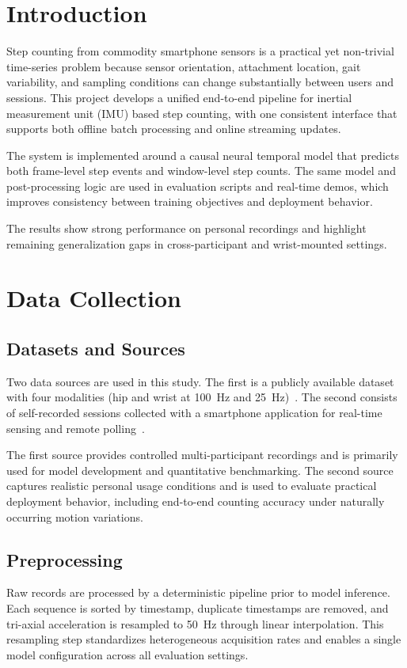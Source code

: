 \section{Introduction}
Step counting from commodity smartphone sensors is a practical yet non-trivial time-series problem because sensor orientation, attachment location, gait variability, and sampling conditions can change substantially between users and sessions. This project develops a unified end-to-end pipeline for inertial measurement unit (IMU) based step counting, with one consistent interface that supports both offline batch processing and online streaming updates.

The system is implemented around a causal neural temporal model that predicts both frame-level step events and window-level step counts. The same model and post-processing logic are used in evaluation scripts and real-time demos, which improves consistency between training objectives and deployment behavior.

The results show strong performance on personal recordings and highlight remaining generalization gaps in cross-participant and wrist-mounted settings.

\section{Data Collection}
\subsection{Datasets and Sources}
Two data sources are used in this study. The first is a publicly available dataset with four modalities (hip and wrist at 100~Hz and 25~Hz)~\cite{oxwalk}. The second consists of self-recorded sessions collected with a smartphone application for real-time sensing and remote polling~\cite{phyphox}.

The first source provides controlled multi-participant recordings and is primarily used for model development and quantitative benchmarking. The second source captures realistic personal usage conditions and is used to evaluate practical deployment behavior, including end-to-end counting accuracy under naturally occurring motion variations.

\subsection{Preprocessing}
Raw records are processed by a deterministic pipeline prior to model inference. Each sequence is sorted by timestamp, duplicate timestamps are removed, and tri-axial acceleration is resampled to 50~Hz through linear interpolation. This resampling step standardizes heterogeneous acquisition rates and enables a single model configuration across all evaluation settings.

